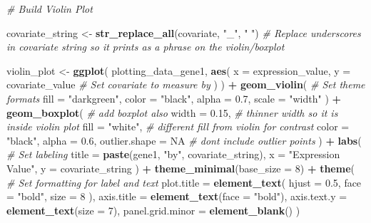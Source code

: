 \documentclass[
]{article}
\newenvironment{Shaded}{\begin{snugshade}}{\end{snugshade}}
\newcommand{\AttributeTok}[1]{\textcolor[rgb]{0.13,0.29,0.53}{#1}}
\newcommand{\CommentTok}[1]{\textcolor[rgb]{0.56,0.35,0.01}{\textit{#1}}}
\newcommand{\ConstantTok}[1]{\textcolor[rgb]{0.56,0.35,0.01}{#1}}
\newcommand{\DecValTok}[1]{\textcolor[rgb]{0.00,0.00,0.81}{#1}}
\newcommand{\FloatTok}[1]{\textcolor[rgb]{0.00,0.00,0.81}{#1}}
\newcommand{\FunctionTok}[1]{\textcolor[rgb]{0.13,0.29,0.53}{\textbf{#1}}}
\newcommand{\NormalTok}[1]{#1}
\newcommand{\OtherTok}[1]{\textcolor[rgb]{0.56,0.35,0.01}{#1}}
\newcommand{\SpecialCharTok}[1]{\textcolor[rgb]{0.81,0.36,0.00}{\textbf{#1}}}
\newcommand{\StringTok}[1]{\textcolor[rgb]{0.31,0.60,0.02}{#1}}
\begin{document}
\begin{Shaded}
\begin{Highlighting}[]
  \CommentTok{\# Build Violin Plot}
  
\NormalTok{  covariate\_string }\OtherTok{\textless{}{-}} \FunctionTok{str\_replace\_all}\NormalTok{(covariate, }\StringTok{"\_"}\NormalTok{, }\StringTok{" "}\NormalTok{) }\CommentTok{\# Replace underscores in covariate string so it prints as a phrase on the violin/boxplot}

\NormalTok{  violin\_plot }\OtherTok{\textless{}{-}} \FunctionTok{ggplot}\NormalTok{(}
\NormalTok{  plotting\_data\_gene1,}
  \FunctionTok{aes}\NormalTok{(}
    \AttributeTok{x =}\NormalTok{ expression\_value,}
    \AttributeTok{y =}\NormalTok{ covariate\_value  }\CommentTok{\# Set covariate to measure by}
\NormalTok{  )}
\NormalTok{) }\SpecialCharTok{+}
  \FunctionTok{geom\_violin}\NormalTok{( }\CommentTok{\# Set theme formats }
    \AttributeTok{fill =} \StringTok{"darkgreen"}\NormalTok{,}
    \AttributeTok{color =} \StringTok{"black"}\NormalTok{,}
    \AttributeTok{alpha =} \FloatTok{0.7}\NormalTok{,}
    \AttributeTok{scale =} \StringTok{"width"}
\NormalTok{  ) }\SpecialCharTok{+}
  \FunctionTok{geom\_boxplot}\NormalTok{( }\CommentTok{\# add boxplot also }
    \AttributeTok{width =} \FloatTok{0.15}\NormalTok{,          }\CommentTok{\# thinner width so it is inside violin plot}
    \AttributeTok{fill =} \StringTok{"white"}\NormalTok{,        }\CommentTok{\# different fill from violin for contrast}
    \AttributeTok{color =} \StringTok{"black"}\NormalTok{,}
    \AttributeTok{alpha =} \FloatTok{0.6}\NormalTok{,}
    \AttributeTok{outlier.shape =} \ConstantTok{NA}     \CommentTok{\# don\textquotesingle{}t include outlier points}
\NormalTok{  ) }\SpecialCharTok{+}
  \FunctionTok{labs}\NormalTok{( }\CommentTok{\# Set labeling}
    \AttributeTok{title =} \FunctionTok{paste}\NormalTok{(gene1, }\StringTok{"by"}\NormalTok{, covariate\_string),}
    \AttributeTok{x =} \StringTok{"Expression Value"}\NormalTok{,}
    \AttributeTok{y =}\NormalTok{ covariate\_string}
\NormalTok{  ) }\SpecialCharTok{+}
  \FunctionTok{theme\_minimal}\NormalTok{(}\AttributeTok{base\_size =} \DecValTok{8}\NormalTok{) }\SpecialCharTok{+}
  \FunctionTok{theme}\NormalTok{( }\CommentTok{\# Set formatting for label and text}
    \AttributeTok{plot.title =} \FunctionTok{element\_text}\NormalTok{(}
      \AttributeTok{hjust =} \FloatTok{0.5}\NormalTok{,}
      \AttributeTok{face =} \StringTok{"bold"}\NormalTok{,}
      \AttributeTok{size =} \DecValTok{8}
\NormalTok{    ),}
    \AttributeTok{axis.title =} \FunctionTok{element\_text}\NormalTok{(}\AttributeTok{face =} \StringTok{"bold"}\NormalTok{),}
    \AttributeTok{axis.text.y =} \FunctionTok{element\_text}\NormalTok{(}\AttributeTok{size =} \DecValTok{7}\NormalTok{),}
    \AttributeTok{panel.grid.minor =} \FunctionTok{element\_blank}\NormalTok{()}
\NormalTok{  )}
  

\end{Highlighting}
\end{Shaded}
\end{document}

